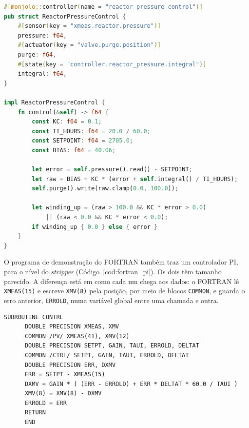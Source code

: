 \noindent\begin{minipage}{\linewidth}
\begin{lstlisting}[language=Rust, caption={Malha PI da pressão do reator no \texttt{tep-plant}}, label={cod:rust_pi}]
#[monjolo::controller(name = "reactor_pressure_control")]
pub struct ReactorPressureControl {
    #[sensor(key = "xmeas.reactor.pressure")]
    pressure: f64,
    #[actuator(key = "valve.purge.position")]
    purge: f64,
    #[state(key = "controller.reactor_pressure.integral")]
    integral: f64,
}

impl ReactorPressureControl {
    fn control(&self) -> f64 {
        const KC: f64 = 0.1;
        const TI_HOURS: f64 = 20.0 / 60.0;
        const SETPOINT: f64 = 2705.0;
        const BIAS: f64 = 40.06;

        let error = self.pressure().read() - SETPOINT;
        let raw = BIAS + KC * (error + self.integral() / TI_HOURS);
        self.purge().write(raw.clamp(0.0, 100.0));

        let winding_up = (raw > 100.0 && KC * error > 0.0)
            || (raw < 0.0 && KC * error < 0.0);
        if winding_up { 0.0 } else { error }
    }
}
\end{lstlisting}
\end{minipage}

O programa de demonstração do FORTRAN também traz um controlador PI, para o nível do \textit{stripper} (Código~\ref{cod:fortran_pi}). Os dois têm tamanho parecido. A diferença está em como cada um chega aos dados: o FORTRAN lê \texttt{XMEAS(15)} e escreve \texttt{XMV(8)} pela posição, por meio de blocos \texttt{COMMON}, e guarda o erro anterior, \texttt{ERROLD}, numa variável global entre uma chamada e outra.

\noindent\begin{minipage}{\linewidth}
\begin{lstlisting}[language={[77]Fortran}, deletekeywords={ERR}, caption={Controlador PI do programa de demonstração do FORTRAN}, label={cod:fortran_pi}]
      SUBROUTINE CONTRL
      DOUBLE PRECISION XMEAS, XMV
      COMMON /PV/ XMEAS(41), XMV(12)
      DOUBLE PRECISION SETPT, GAIN, TAUI, ERROLD, DELTAT
      COMMON /CTRL/ SETPT, GAIN, TAUI, ERROLD, DELTAT
      DOUBLE PRECISION ERR, DXMV
      ERR = SETPT - XMEAS(15)
      DXMV = GAIN * ( (ERR - ERROLD) + ERR * DELTAT * 60.0 / TAUI )
      XMV(8) = XMV(8) - DXMV
      ERROLD = ERR
      RETURN
      END
\end{lstlisting}
\end{minipage}


